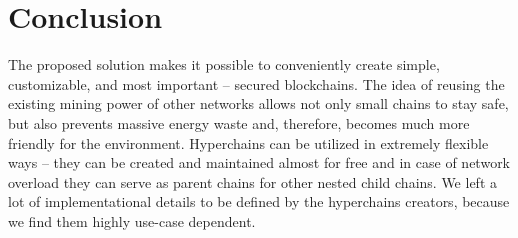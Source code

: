 \section{Conclusion}

The proposed solution makes it possible to conveniently create simple, customizable, and most
important – secured blockchains. The idea of reusing the existing mining power
of other networks allows not only small chains to stay safe, but also
prevents massive energy waste and, therefore, becomes much more friendly for the environment.
Hyperchains can be utilized in extremely flexible ways – they can be created and
maintained almost for free and in case of network overload they can serve as
parent chains for other nested child chains. We left a lot of implementational
details to be defined by the hyperchains creators, because we find them highly
use-case dependent.
